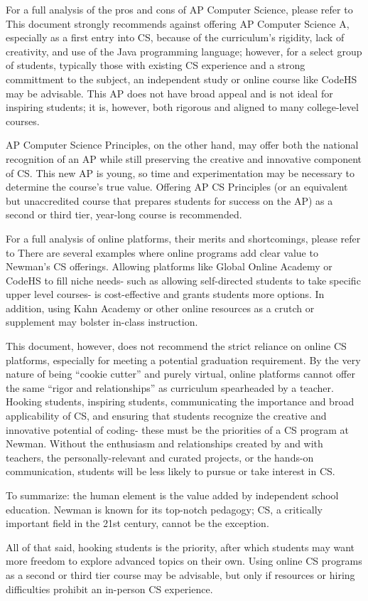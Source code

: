For a full analysis of the pros and cons of AP Computer Science, please refer to %
This document strongly recommends against offering AP Computer Science A, especially as a first entry into CS, because of the curriculum's rigidity, lack of creativity, and use of the Java programming language; however, for a select group of students, typically those with existing CS experience and a strong committment to the subject, an independent study or online course like CodeHS may be advisable. This AP does not have broad appeal and is not ideal for inspiring students; it is, however, both rigorous and aligned to many college-level courses. \par
AP Computer Science Principles, on the other hand, may offer both the national recognition of an AP while still preserving the creative and innovative component of CS. This new AP is young, so time and experimentation may be necessary to determine the course's true value. Offering AP CS Principles (or an equivalent but unaccredited course that prepares students for success on the AP) as a second or third tier, year-long course is recommended.\par


For a full analysis of online platforms, their merits and shortcomings, please refer to %
There are several examples where online programs add clear value to Newman's CS offerings. Allowing platforms like Global Online Academy or CodeHS to fill niche needs- such as allowing self-directed students to take specific upper level courses- is cost-effective and grants students more options. In addition, using Kahn Academy or other online resources as a crutch or supplement may bolster in-class instruction.\par
This document, however, does not recommend the strict reliance on online CS platforms, especially for meeting a potential graduation requirement. By the very nature of being ``cookie cutter'' and purely virtual, online platforms cannot offer the same ``rigor and relationships'' as curriculum spearheaded by a teacher. Hooking students, inspiring students, communicating the importance and broad applicability of CS, and ensuring that students recognize the creative and innovative potential of coding- these must be the priorities of a CS program at Newman. Without the enthusiasm and relationships created by and with teachers, the personally-relevant and curated projects, or the hands-on communication, students will be less likely to pursue or take interest in CS.\par 
To summarize: the human element is the value added by independent school education. Newman is known for its top-notch pedagogy; CS, a critically important field in the 21st century, cannot be the exception. \par
All of that said, hooking students is the priority, after which students may want more freedom to explore advanced topics on their own. Using online CS programs as a second or third tier course may be advisable, but only if resources or hiring difficulties prohibit an in-person CS experience. \par   
{}


